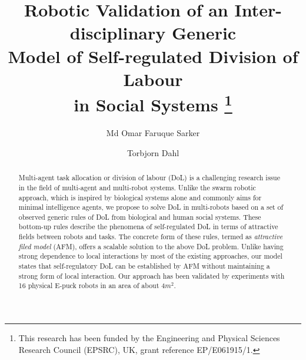 \documentclass{llncs}
\begin{document}
\title{Robotic Validation of an Inter-disciplinary Generic\\
Model of Self-regulated Division of Labour\\ in Social Systems
\thanks{This research has been funded by the Engineering and Physical Sciences Research Council (EPSRC), UK, grant reference EP/E061915/1.}
}
\author{Md Omar Faruque Sarker \and
Torbjorn Dahl %
}
\maketitle
\begin{abstract}
Multi-agent task allocation or division of labour (DoL) is a challenging research issue in the field of multi-agent and multi-robot systems.  Unlike the swarm robotic approach, which is inspired by biological systems alone and commonly aims for minimal intelligence agents, we propose to solve DoL in multi-robots based on a set of observed generic rules of DoL from biological and human social systems. These bottom-up rules describe the phenomena of self-regulated DoL in terms of attractive fields between robots and tasks. The concrete form of these rules, termed as \textit{attractive filed model} (AFM), offers a scalable solution to the above DoL problem. Unlike having strong dependence to local interactions by most of the existing approaches, our model states that self-regulatory DoL can be established by AFM without maintaining a strong form of local interaction. Our approach has been validated by experiments with 16 physical E-puck robots in an area of about 4$m^2$.
\end{abstract}
\end{document}
